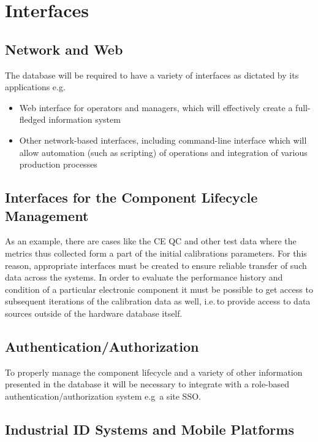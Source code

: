 \documentclass[pdftex,12pt,letter]{article}
\begin{document}
\section{Interfaces}

\subsection{Network and Web}

The database will be required to have a variety of interfaces as dictated by its applications e.g.

\begin{itemize}

\item Web interface for operators and managers, which will effectively create a full-fledged information system

\item Other network-based interfaces, including command-line interface which will allow automation (such as scripting) of operations
and integration of various production processes

\end{itemize}



\subsection{Interfaces for the Component Lifecycle Management}
As an example, there are cases like the CE QC and other test data where the metrics thus collected form a part of the
initial calibrations parameters. For this reason, appropriate interfaces must be created to ensure
reliable transfer of such data across the systems. In order to evaluate the performance history and condition of a particular
electronic component it must be possible to get access to subsequent iterations
of the calibration data as well, i.e.\,to provide access to data sources outside of the hardware database itself.

\subsection{Authentication/Authorization}
To properly manage the component lifecycle and a variety of other information presented in the database it will be necessary
to integrate with a role-based authentication/authorization system e.g\, a site SSO.

\subsection{Industrial ID Systems and Mobile Platforms}
\end{document}
